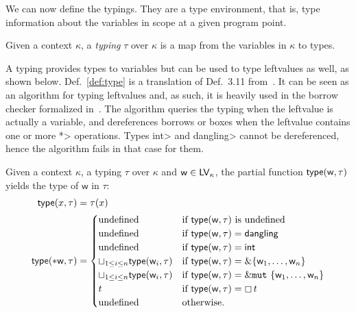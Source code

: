 We can now define the typings. They are a type environment, that is,
type information about the variables in scope at a given program point.

\begin{definition}[Typing]\label{def:typing}
  Given a context $\kappa$, a \emph{typing} $\tau$ over $\kappa$ is
  a map from the variables in $\kappa$ to types.
\end{definition}

A typing provides types to variables but can be used to type
leftvalues as well, as shown below. Def.~\ref{def:type} is a translation of
Def.~3.11 from~\cite{Pearce21}. It can be seen as an algorithm for typing leftvalues
and, as such, it is heavily used in the borrow checker formalized in~\cite{Pearce21}.
The algorithm queries the typing when the leftvalue is actually a variable,
and dereferences borrows or boxes when the leftvalue contains one or more
\<*> operations. Types \<int> and \<dangling> cannot be dereferenced, hence the
algorithm fails in that case for them.

\begin{definition}\label{def:type}
  Given a context $\kappa$, a typing $\tau$ over $\kappa$
  and $\mathsf{w}\in\mathsf{LV}_\kappa$, the partial function
  $\mathsf{type}(\mathsf{w},\tau)$ yields the type of $\mathsf{w}$ in $\tau$:
  \begin{align*}
    \mathsf{type}(x,\tau)&=\tau(x)\\
    \mathsf{type}(*\mathsf{w},\tau)&=\begin{cases}
    \text{undefined} & \text{if $\mathsf{type}(\mathsf{w},\tau)$ is undefined}\\
    \text{undefined} & \text{if $\mathsf{type}(\mathsf{w},\tau)=\mathsf{dangling}$}\\
    \text{undefined} & \text{if $\mathsf{type}(\mathsf{w},\tau)=\mathsf{int}$}\\
    \sqcup_{1\le i\le n}\mathsf{type}(\mathsf{w}_i,\tau) & \text{if $\mathsf{type}(\mathsf{w},\tau)=\&\{\mathsf{w}_1,\ldots,\mathsf{w}_n\}$}\\
    \sqcup_{1\le i\le n}\mathsf{type}(\mathsf{w}_i,\tau) & \text{if $\mathsf{type}(\mathsf{w},\tau)=\&\mathtt{mut}\ \{\mathsf{w}_1,\ldots,\mathsf{w}_n\}$}\\
    t & \text{if $\mathsf{type}(\mathsf{w},\tau)=\boxempty\,{t}$}\\
    \text{undefined} & \text{otherwise.}
    \end{cases}
  \end{align*}
\end{definition}

